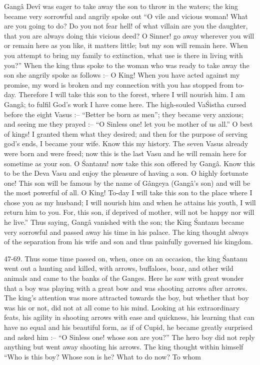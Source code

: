 Gang\^a Dev\^i was eager to take away the son to throw in the waters; the king became very sorrowful and angrily spoke out ``O vile and vicious woman! What are you going to do? Do you not fear hell! of what villain are you the daughter, that you are always doing this vicious deed? O Sinner! go away wherever you will or remain here as yon like, it matters little; but my son will remain here. When you attempt to bring my family to extinction, what use is there in living with you?'' When the king thus spoke to the woman who was ready to take away the son she angrily spoke as follows :-- O King! When you have acted against my promise, my word is broken and my connection with you has stopped from to-day. Therefore I will take this son to the forest, where I will nourish him. I am Gang\^a; to fulfil God's work I have come here. The high-souled Va\'Sistha cursed before the eight Vasus :-- ``Better be born as men''; they became very anxious; and seeing me they prayed :-- ``O Sinless one! let you be mother of us all.'' O best of kings! I granted them what they desired; and then for the purpose of serving god's ends, I became your wife. Know this my history. The seven Vasus already were born and were freed; now this is the last Vasu and he will remain here for sometime as your son. O \'Santanu! now take this son offered by Gang\^a. Know this to be the Deva Vasu and enjoy the pleasure of having a son. O highly fortunate one! This son will be famous by the name of G\^angeya (Gang\^a's son) and will be the most powerful of all. O King! To-day I will take this son to the place where I chose you as my husband; I will nourish him and when he attains his youth, I will return him to you. For, this son, if deprived of mother, will not be happy nor will he live.'' Thus saying, Gang\^a vanished with the son; the King \'Santanu became very sorrowful and passed away his time in his palace. The king thought always of the separation from his wife and son and thus painfully governed his kingdom.

47-69. Thus some time passed on, when, once on an occasion, the king \'Santanu went out a hunting and killed, with arrows, buffaloes, boar, and other wild animals and came to the banks of the Ganges. Here he saw with great wonder that a boy was playing with a great bow and was shooting arrows after arrows. The king's attention was more attracted towards the boy, but whether that boy was his or not, did not at all come to his mind. Looking at his extraordinary feats, his agility in shooting arrows with ease and quickness, his learning that can have no equal and his beautiful form, as if of Cupid, he became greatly surprised and asked him :-- ``O Sinless one! whose son are you?'' The hero boy did not reply anything but went away shooting his arrows. The king thought within himself ``Who is this boy? Whose son is he? What to do now? To whom

